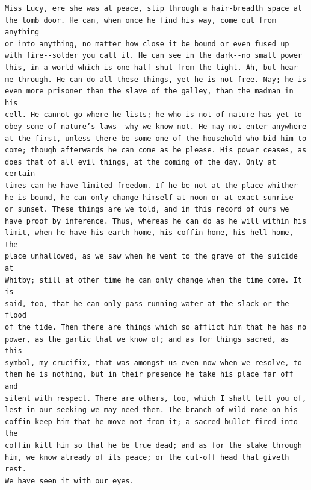 \documentclass{article}
\begin{document}
\begin{verbatim}
Miss Lucy, ere she was at peace, slip through a hair-breadth space at
the tomb door. He can, when once he find his way, come out from anything
or into anything, no matter how close it be bound or even fused up
with fire--solder you call it. He can see in the dark--no small power
this, in a world which is one half shut from the light. Ah, but hear
me through. He can do all these things, yet he is not free. Nay; he is
even more prisoner than the slave of the galley, than the madman in his
cell. He cannot go where he lists; he who is not of nature has yet to
obey some of nature’s laws--why we know not. He may not enter anywhere
at the first, unless there be some one of the household who bid him to
come; though afterwards he can come as he please. His power ceases, as
does that of all evil things, at the coming of the day. Only at certain
times can he have limited freedom. If he be not at the place whither
he is bound, he can only change himself at noon or at exact sunrise
or sunset. These things are we told, and in this record of ours we
have proof by inference. Thus, whereas he can do as he will within his
limit, when he have his earth-home, his coffin-home, his hell-home, the
place unhallowed, as we saw when he went to the grave of the suicide at
Whitby; still at other time he can only change when the time come. It is
said, too, that he can only pass running water at the slack or the flood
of the tide. Then there are things which so afflict him that he has no
power, as the garlic that we know of; and as for things sacred, as this
symbol, my crucifix, that was amongst us even now when we resolve, to
them he is nothing, but in their presence he take his place far off and
silent with respect. There are others, too, which I shall tell you of,
lest in our seeking we may need them. The branch of wild rose on his
coffin keep him that he move not from it; a sacred bullet fired into the
coffin kill him so that he be true dead; and as for the stake through
him, we know already of its peace; or the cut-off head that giveth rest.
We have seen it with our eyes.


\end{verbatim}
\end{document}
